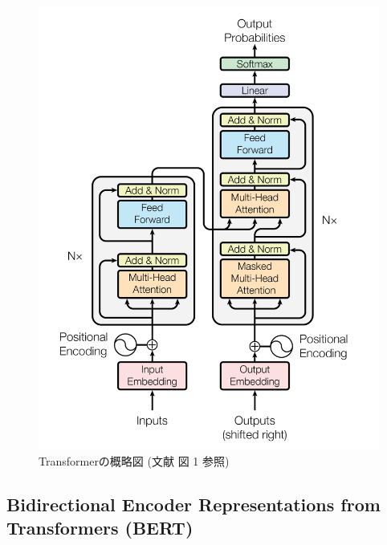 \begin{figure}[p]
    \centering
    \includegraphics[width=16cm]{assets/Transformer.png}
    \caption[Transformerの概略図]{Transformerの概略図 (文献 \cite{Transformer} 図 1 参照)}
    \label{Transformer}
\end{figure}

\subsection{Bidirectional Encoder Representations from Transformers (BERT)}

